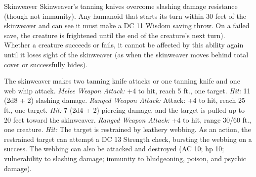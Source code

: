 \documentclass[10pt,a4paper,twoside,twocolumn,openany,bg=print,nodeprecatedcode]{dndbook}
\begin{document}
\begin{DndMonster}[float*=t]{Skinweaver}
\DndMonsterBasics[
armor-class = {17 (natural & tailored leather)},
hit-points = {\DndDice{8d10 + 24}},
speed = {30 ft., 15 ft. (key)}
]
\DndMonsterAbilityScores[
 str = 12,
 dex = 14,
 con = 16,
 int = 14,
 wis = 13,
 cha = 18
]
\DndMonsterDetails[
skills = {Stealth +4},
damage-resistances = {fire},
senses = {darkvision 60 ft., passive perception 11},
languages = {any three languages},
challenge = 3,
]
Skinweaver's tanning knives overcome slashing damage resistance (though not immunity).
Any humanoid that starts its turn within 30 feet of the skinweaver and can see it must make a DC 11 Wisdom saving throw. On a failed save, the creature is frightened until the end of the creature's next turn). Whether a creature succeeds or fails, it cannot be affected by this ability again until it loses sight of the skinweaver (as when the skinweaver moves behind total cover or successfully hides).
\par
{}
The skinweaver makes two tanning knife attacks or one tanning knife and one web whip attack.
\textsl{Melee Weapon Attack:} +4 to hit, reach 5 ft., one target. \textsl{Hit:} 11 (2d8 + 2) slashing damage.
\textsl{Ranged Weapon Attack:} Attack: +4 to hit, reach 25 ft., one target. \textsl{Hit:} 7 (2d4 + 2) piercing damage, and the target is pulled up to 20 feet toward the skinweaver.
\textsl{Ranged Weapon Attack:} +4 to hit, range 30/60 ft., one creature. \textsl{Hit:} The target is restrained by leathery webbing. As an action, the restrained target can attempt a DC 13 Strength check, bursting the webbing on a success. The webbing can also be attacked and destroyed (AC 10; hp 10; vulnerability to slashing damage; immunity to bludgeoning, poison, and psychic damage).
\end{DndMonster}
\end{document}
